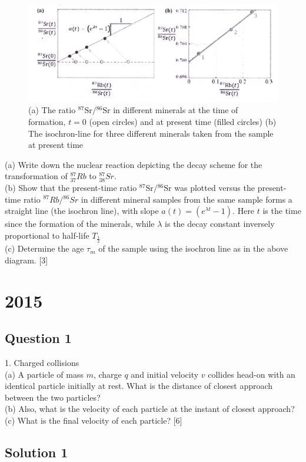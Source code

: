 \documentclass{article}
\begin{document}
\begin{figure}
	\centering
	\includegraphics[width=0.5\linewidth]{spho_book_TYS_images/2014q10.png}
	\caption{(a) The ratio ${ }^{87} \mathrm{Sr} /{ }^{86} \mathrm{Sr}$ in different minerals at the time of formation, $t=0$ (open circles) and at present time (filled circles) (b) The isochron-line for three different minerals taken from the sample at present time}
\end{figure}
(a) Write down the nuclear reaction depicting the decay scheme for the transformation of ${ }_{37}^{87} R b$ to ${ }_{38}^{87} Sr$. \\
(b) Show that the present-time ratio ${ }^{87} \mathrm{Sr} /{ }^{86} \mathrm{Sr}$ was plotted versus the present-time ratio ${ }^{87} R b /{ }^{86} S r$ in different mineral samples from the same sample forms a straight line (the isochron line), with slope $a(t)=\left(e^{\lambda t}-1\right) .$ Here $t$ is the time since the formation of the minerals, while $\lambda$ is the decay constant inversely proportional to half-life $T_{\frac{1}{2}}$ \\
(c) Determine the age $\tau_{m}$ of the sample using the isochron line as in the above diagram. [3]

\section{2015}

\subsection{Question 1}
1. Charged collisions \\
(a) A particle of mass $m$, charge $q$ and initial velocity $v$ collides head-on with an identical particle initially at rest. What is the distance of closest approach between the two particles? \\
(b) Also, what is the velocity of each particle at the instant of closest approach? \\
(c) What is the final velocity of each particle? [6]

\subsection{Solution 1}
\end{document}
